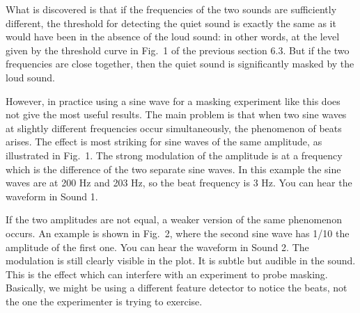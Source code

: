   What is discovered is that if the frequencies of the two sounds are 
  sufficiently different, the threshold for detecting the quiet sound is 
  exactly the same as it would have been in the absence of the loud sound: in 
  other words, at the level given by the threshold curve in Fig.\ 1 of the 
  previous section 6.3. But if the two frequencies are close together, then the 
  quiet sound is significantly masked by the loud sound. 

  However, in practice using a sine wave for a masking experiment like this 
  does not give the most useful results. The main problem is that when two sine 
  waves at slightly different frequencies occur simultaneously, the phenomenon 
  of beats arises. The effect is most striking for sine waves of the same 
  amplitude, as illustrated in Fig.\ 1. The strong modulation of the amplitude 
  is at a frequency which is the difference of the two separate sine waves. In 
  this example the sine waves are at 200 Hz and 203 Hz, so the beat frequency 
  is 3 Hz. You can hear the waveform in Sound 1. 


\audio{}

  If the two amplitudes are not equal, a weaker version of the same phenomenon 
  occurs. An example is shown in Fig.\ 2, where the second sine wave has 1/10 
  the amplitude of the first one. You can hear the waveform in Sound 2. The 
  modulation is still clearly visible in the plot. It is subtle but audible in 
  the sound. This is the effect which can interfere with an experiment to probe 
  masking. Basically, we might be using a different feature detector to notice 
  the beats, not the one the experimenter is trying to exercise. 


\audio{}

